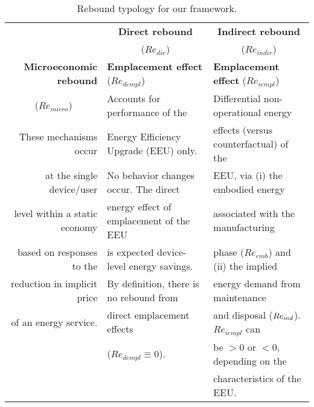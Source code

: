 


\begin{table}
\footnotesize
\begin{center}
\caption{Rebound typology for our framework.}
\label{tab:rebound_typology}
\begin{tabular}{ r l l }
\toprule
                                   & \multicolumn{1}{c}{\textbf{Direct rebound}}  & \multicolumn{1}{c}{\textbf{Indirect rebound}} \\
                                   & \multicolumn{1}{c}{($Re_{dir}$)}             & \multicolumn{1}{c}{($Re_{indir}$)}            \\
\midrule
\textbf{Microeconomic rebound}     & \textbf{Emplacement effect} ($Re_{dempl}$)   & \textbf{Emplacement effect} ($Re_{iempl}$) \\
\multicolumn{1}{c}{($Re_{micro}$)} & Accounts for performance of the              & Differential non-operational energy  \\
These mechanisms occur             & Energy Efficiency Upgrade (EEU) only.        & effects (versus counterfactual) of the  \\
at the single device/user          & No behavior changes occur. The direct        & EEU, via (i) the embodied energy  \\
level within a static economy      & energy effect of emplacement of the EEU      & associated with the manufacturing  \\
based on responses to the          & is expected device-level energy savings.     & phase ($Re_{emb}$) and (ii) the implied  \\
reduction in implicit price        & By definition, there is no rebound from      & energy demand from maintenance   \\
of an energy service.              & direct emplacement effects                   & and disposal ($Re_{md}$). $Re_{iempl}$ can  \\
                                   & ($Re_{dempl} \equiv 0$).                     & be $> 0$ or $< 0$, depending on the   \\
                                   &                                              & characteristics of the EEU.        \\
                                   \cmidrule{2-3}

\end{tabular}
\end{center}
\end{table}
